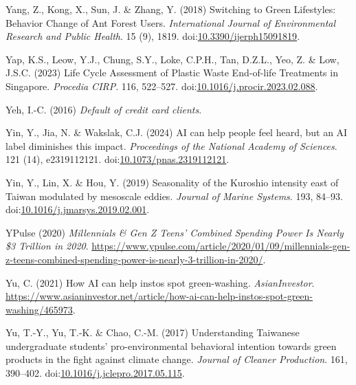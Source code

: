 \documentclass[
  letterpaper,
  DIV=11,
  numbers=noendperiod]{scrartcl}
\newlength{\cslhangindent}
\newenvironment{CSLReferences}[2] %
 {\begin{list}{}{%
  \setlength{\itemindent}{0pt}
  \setlength{\leftmargin}{0pt}
  \setlength{\parsep}{0pt}
  \ifodd #1
   \setlength{\leftmargin}{\cslhangindent}
   \setlength{\itemindent}{-1\cslhangindent}
  \fi
  \setlength{\itemsep}{#2\baselineskip}}}
 {\end{list}}
\begin{document}
\begin{CSLReferences}{0}{1}
Yang, Z., Kong, X., Sun, J. \& Zhang, Y. (2018) Switching to {Green
Lifestyles}: {Behavior Change} of {Ant Forest Users}.
\emph{International Journal of Environmental Research and Public
Health}. 15 (9), 1819.
doi:\href{https://doi.org/10.3390/ijerph15091819}{10.3390/ijerph15091819}.

Yap, K.S., Leow, Y.J., Chung, S.Y., Loke, C.P.H., Tan, D.Z.L., Yeo, Z.
\& Low, J.S.C. (2023) Life {Cycle Assessment} of {Plastic Waste
End-of-life Treatments} in {Singapore}. \emph{Procedia CIRP}. 116,
522--527.
doi:\href{https://doi.org/10.1016/j.procir.2023.02.088}{10.1016/j.procir.2023.02.088}.

Yeh, I.-C. (2016) \emph{Default of credit card clients}.

Yin, Y., Jia, N. \& Wakslak, C.J. (2024) {AI} can help people feel
heard, but an {AI} label diminishes this impact. \emph{Proceedings of
the National Academy of Sciences}. 121 (14), e2319112121.
doi:\href{https://doi.org/10.1073/pnas.2319112121}{10.1073/pnas.2319112121}.

Yin, Y., Lin, X. \& Hou, Y. (2019) Seasonality of the {Kuroshio}
intensity east of {Taiwan} modulated by mesoscale eddies. \emph{Journal
of Marine Systems}. 193, 84--93.
doi:\href{https://doi.org/10.1016/j.jmarsys.2019.02.001}{10.1016/j.jmarsys.2019.02.001}.

YPulse (2020) \emph{Millennials \& {Gen Z Teens}' {Combined Spending
Power Is Nearly} \$3 {Trillion} in 2020}.
\url{https://www.ypulse.com/article/2020/01/09/millennials-gen-z-teens-combined-spending-power-is-nearly-3-trillion-in-2020/}.

Yu, C. (2021) How {AI} can help instos spot green-washing.
\emph{AsianInvestor}.
\url{https://www.asianinvestor.net/article/how-ai-can-help-instos-spot-green-washing/465973}.

Yu, T.-Y., Yu, T.-K. \& Chao, C.-M. (2017) Understanding {Taiwanese}
undergraduate students' pro-environmental behavioral intention towards
green products in the fight against climate change. \emph{Journal of
Cleaner Production}. 161, 390--402.
doi:\href{https://doi.org/10.1016/j.jclepro.2017.05.115}{10.1016/j.jclepro.2017.05.115}.


\end{CSLReferences}
\end{document}
